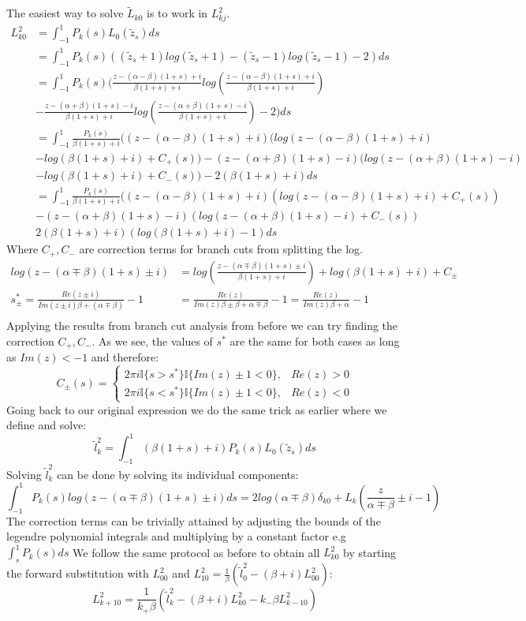\documentclass{article}
\begin{document}
The easiest way to solve $\tilde L_{k0}$ is to work in $L_{kj}^2$.
\begin{align}
    L_{k0}^2 &= \int_{-1}^1P_k(s)L_0(\tilde z_s)ds\\
    &= \int_{-1}^1P_k(s)((\tilde z_s+1)log(\tilde z_s+1)-(\tilde z_s-1)log(\tilde z_s-1)-2)ds\\
    &= \int_{-1}^1P_k(s)(\frac{z-(\alpha-\beta)(1+s)+i}{\beta(1+s)+i}log(\frac{z-(\alpha-\beta)(1+s)+i}{\beta(1+s)+i})\\
    &-\frac{z-(\alpha+\beta)(1+s)-i}{\beta(1+s)+i}log(\frac{z-(\alpha+\beta)(1+s)-i}{\beta(1+s)+i})-2)ds\\
    &=\int_{-1}^1\frac{P_k(s)}{\beta(1+s)+i}((z-(\alpha-\beta)(1+s)+i)(log(z-(\alpha-\beta)(1+s)+i)\\
    &-log(\beta(1+s)+i)+C_+(s))-(z-(\alpha+\beta)(1+s)-i)(log(z-(\alpha+\beta)(1+s)-i)\\
    &-log(\beta(1+s)+i)+C_-(s))-2(\beta(1+s)+i)ds\\
    &=\int_{-1}^1\frac{P_k(s)}{\beta(1+s)+i}((z-(\alpha-\beta)(1+s)+i)(log(z-(\alpha-\beta)(1+s)+i)+C_+(s))\\
    &-(z-(\alpha+\beta)(1+s)-i)(log(z-(\alpha+\beta)(1+s)-i)+C_-(s))\\
    &2(\beta(1+s)+i)(log(\beta(1+s)+i)-1)ds
\end{align}
Where $C_+, C_-$ are correction terms for branch cuts from splitting the log.
\begin{align}
    log(z-(\alpha\mp\beta)(1+s)\pm i)&=log(\frac{z-(\alpha\mp\beta)(1+s)\pm i}{\beta(1+s)+i})+log(\beta(1+s)+i)+C_\pm\\
    s_\pm^*= \frac{Re(z\pm i)}{Im(z\pm i)\beta+(\alpha\mp\beta)}-1&=\frac{Re(z)}{Im(z)\beta\pm\beta+\alpha\mp\beta}-1=\frac{Re(z)}{Im(z)\beta+\alpha}-1\\
\end{align}
Applying the results from branch cut analysis from before we can try finding the correction $C_+,C_-$.
As we see, the values of $s^*$ are the same for both cases as long as $Im(z)<-1$ and therefore:
$$C_\pm(s)=\begin{cases}
    2\pi i\mathbb{I}\{s>s^*\}\mathbb{I}\{Im(z)\pm1<0\},&Re(z)>0\\
    2\pi i\mathbb{I}\{s<s^*\}\mathbb{I}\{Im(z)\pm1<0\},&Re(z)<0
\end{cases}$$
Going back to our original expression we do the same trick as earlier where we define and solve:
$$\tilde l_k^2=\int_{-1}^1(\beta(1+s)+i)P_k(s)L_0(\tilde z_s)ds$$
Solving $\tilde l_k^2$ can be done by solving its individual components:
$$\int_{-1}^1P_k(s)log(z-(\alpha\mp\beta)(1+s)\pm i)ds=2log(\alpha\mp\beta)\delta_{k0}
+L_k(\frac{z}{\alpha\mp\beta}\pm i-1)$$
The correction terms can be trivially attained by adjusting the bounds of the legendre polynomial integrals and multiplying by a constant factor e.g $\int_s^1P_k(s)ds$
We follow the same protocol as before to obtain all $L_{k0}^2$ by starting the forward substitution with $L_{00}^2$ and $L_{10}^2=\frac{1}{\beta}(\tilde l_0^2-(\beta+i)L_{00}^2)$:
$$L_{k+10}^2=\frac{1}{k_+\beta}(\tilde l_k^2-(\beta+i)L_{k0}^2-k_-\beta L_{k-10}^2)$$
\end{document}
